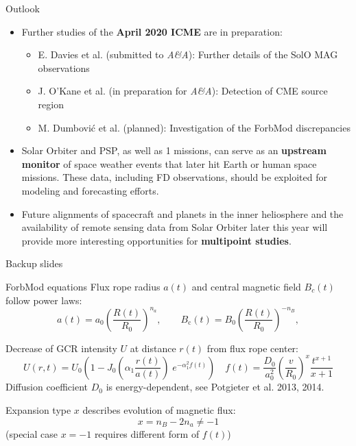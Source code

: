 \documentclass[10pt,aspectratio=169,usenames,dvipsnames]{beamer}
\begin{document}
\begin{frame}{Outlook}
	\begin{itemize}
		\item Further studies of the \textbf{April 2020 ICME} are in preparation:
			\begin{itemize}
				\item E. Davies et al. (submitted to \textit{A\&A}): Further details of the SolO MAG observations
				\item J. O'Kane et al. (in preparation for \textit{A\&A}): Detection of CME source region
				\item M. Dumbović et al. (planned): Investigation of the ForbMod discrepancies
			\end{itemize}
		\item Solar Orbiter and PSP, as well as \SI{1}{\AU} missions, can serve as an \textbf{upstream monitor} of space weather events that later hit Earth or human space missions. These data, including FD observations, should be exploited for modeling and forecasting efforts.
		\item Future alignments of spacecraft and planets in the inner heliosphere and the availability of remote sensing data from Solar Orbiter later this year will provide more interesting opportunities for \textbf{multipoint studies}.
	\end{itemize}
\end{frame}

\appendix
\begin{frame}[standout]
	Backup slides
\end{frame}

\begin{frame}{ForbMod equations}
Flux rope radius $a(t)$ and central magnetic field $B_c(t)$ follow power laws:
\[
a(t) = a_0 \left(\frac{R(t)}{R_0}\right)^{n_a}, \qquad B_\text{c}(t) = B_0 \left(\frac{R(t)}{R_0}\right)^{-n_B},
\]

Decrease of GCR intensity $U$ at distance $r(t)$ from flux rope center:
\[
U(r, t) = U_0 \left(1 - J_0\mathopen{}\left(\alpha_1 \frac{r(t)}{a(t)}\right)\mathclose{} \; e^{-\alpha_1^2 f(t)} \right)
\quad
f(t) = \frac{D_0}{a_0^2} \left(\frac{v}{R_0}\right)^x \frac{t^{x+1}}{x+1}
\]
Diffusion coefficient $D_0$ is energy-dependent, see Potgieter et al. 2013, 2014.

Expansion type $x$ describes evolution of magnetic flux:
\[
x = n_B - 2n_a \neq -1
\]
(special case $x = -1$ requires different form of $f(t)$)
\end{frame}
\end{document}
